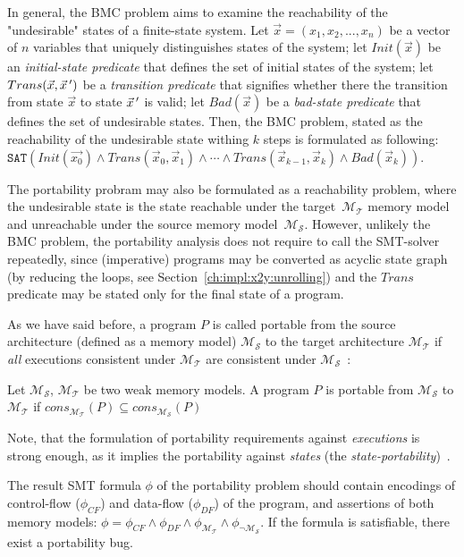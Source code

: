 In general, the BMC problem aims to examine the reachability of the "undesirable" states of a finite-state system. Let $\vec{x} = (x_1, x_2, ..., x_n)$ be a vector of $n$ variables that uniquely distinguishes states of the system; let $Init(\vec{x})$ be an \textit{initial-state predicate} that defines the set of initial states of the system; let $Trans(\vec{x}, \vec{x}\,')$ be a \textit{transition predicate} that signifies whether there the transition from state $\vec{x}$ to state $\vec{x}\,'$ is valid; let $Bad(\vec{x})$ be a \textit{bad-state predicate} that defines the set of undesirable states. Then, the BMC problem, stated as the reachability of the undesirable state withing $k$ steps is formulated as following:
$\mathtt{SAT}( Init(\vec{x_0}) \land Trans(\vec{x}_0, \vec{x}_1) \land \cdots \land Trans(\vec{x}_{k-1}, \vec{x}_k) \land Bad(\vec{x}_k) )$.

The portability probram may also be formulated as a reachability problem, where the undesirable state is the state reachable under the target~$\mathcal{M_T}$ memory model and unreachable under the source memory model~$\mathcal{M_S}$. However, unlikely the BMC problem, the portability analysis does not require to call the SMT-solver repeatedly, since (imperative) programs may be converted as acyclic state graph (by reducing the loops, see Section~\ref{ch:impl:x2y:unrolling}) and the $Trans$ predicate may be stated only for the final state of a program.

As we have said before, a program $P$ is called portable from the source architecture (defined as a memory model) $\mathcal{M_S}$ to the target architecture $\mathcal{M_T}$ if \textit{all} executions consistent under $\mathcal{M_T}$ are consistent under $\mathcal{M_S}$~\cite{Porthos17}:

\begin{definition}[Portability]
Let $\mathcal{M_S}$, $\mathcal{M_T}$ be two weak memory models. A program $P$ is portable from $\mathcal{M_S}$ to $\mathcal{M_T}$ if 
$cons_{\mathcal{M_T}}(P) \subseteq cons_{\mathcal{M_S}}(P)$
\end{definition}

Note, that the formulation of portability requirements against \textit{executions} is strong enough, as it implies the portability against \textit{states} (the \textit{state-portability})~\cite{Porthos17}.

The result SMT formula $\phi$ of the portability problem should contain encodings of control-flow ($\phi_{CF}$) and data-flow ($\phi_{DF}$) of the program, and assertions of both memory models: $\phi = \phi_{CF} \land \phi_{DF} \land \phi_{\mathcal{M_T}} \land \phi_{\lnot\mathcal{M_S}}$. If the formula is satisfiable, there exist a portability bug.

